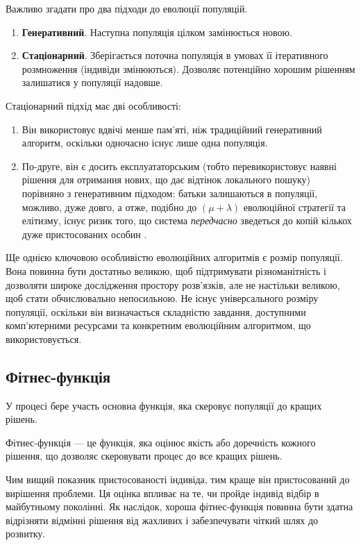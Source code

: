 Важливо згадати про два підходи до еволюції популяцій.
\begin{enumerate}
  \item \textbf{Генеративний}. Наступна популяція цілком замінюється новою.
  \item \textbf{Стаціонарний}. Зберігається поточна популяція
    в умовах її ітеративного розмноження (індивіди змінюються).
    Дозволяє потенційно хорошим рішенням залишатися у популяції надовше.
\end{enumerate}

Стаціонарний підхід має дві особливості:
\begin{enumerate}
  \item Він використовує вдвічі менше пам'яті, ніж традиційний генеративний алгоритм, оскільки одночасно існує лише одна популяція.
  \item По-друге, він є досить експлуататорським (тобто перевикористовує наявні
    рішення для отримання нових, що дає відтінок локального пошуку)
    порівняно з генеративним підходом: батьки залишаються в популяції,
    можливо, дуже довго, а отже, подібно до $(\mu + \lambda)$ еволюційної 
    стратегії та елітизму,
    існує ризик того, що система \textit{передчасно} зведеться до копій
    кількох дуже пристосованих особин \cite{lukeEssentialsMetaheuristicsSet2013}.
\end{enumerate}

Ще однією ключовою особливістю еволюційних алгоритмів є розмір популяції. 
Вона повинна бути достатньо великою, щоб підтримувати різноманітність 
і дозволяти широке дослідження простору розв'язків, але не настільки 
великою, щоб стати обчислювально непосильною. 
Не існує універсального розміру популяції, оскільки він 
визначається складністю завдання, доступними комп'ютерними 
ресурсами та конкретним еволюційним алгоритмом, що використовується.



\subsection{Фітнес-функція}

У процесі бере участь основна функція, яка скеровує популяції до кращих рішень.
\begin{definition}
  Фітнес-функція --- це функція, яка оцінює якість або доречність кожного рішення,
  що дозволяє скеровувати процес до все кращих рішень.
\end{definition}

Чим вищий показник пристосованості індивіда, тим краще він
пристосований до вирішення проблеми. 
Ця оцінка впливає на те, чи пройде індивід відбір
в майбутньому поколінні. 
Як наслідок, хороша фітнес-функція повинна бути здатна 
відрізняти відмінні рішення від жахливих і забезпечувати 
чіткий шлях до розвитку.

